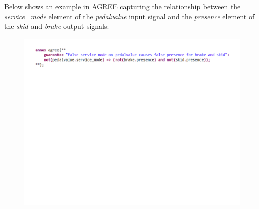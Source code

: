 Below shows an example in AGREE capturing the relationship between the {\em service\_mode} element of the {\em pedalvalue} input signal and the {\em presence} element of the {\em skid} and {\em brake} output signals:

\begin{figure}[h!]
	\hspace*{-4cm}
	\vspace{-0.3in} 
	\begin{center}
		\includegraphics[width=1.0\textwidth]{images/cmd_input_agree.pdf}
	\end{center}
	\vspace{-3.3in}
\end{figure}






 


